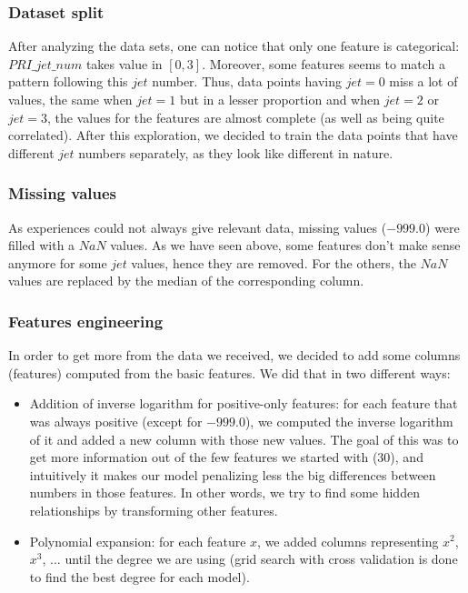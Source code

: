 \documentclass[10pt,conference,compsocconf]{IEEEtran}
\begin{document}
\subsubsection{Dataset split}

After analyzing the data sets, one can notice that only one feature is categorical: $PRI\_jet\_num$ takes value in $[0,3]$. Moreover, some features seems to match a pattern following this $jet$ number. Thus, data points having $jet=0$ miss a lot of values, the same when $jet=1$ but in a lesser proportion and when $jet=2$ or $jet=3$, the values for the features are almost complete (as well as being quite correlated). After this exploration, we decided to train the data points that have different $jet$ numbers separately, as they look like different in nature.

\subsubsection{Missing values}

As experiences could not always give relevant data, missing values ($-999.0$) were filled with a $NaN$ values. As we have seen above, some features don't make sense anymore for some $jet$ values, hence they are removed. For the others, the $NaN$ values are replaced by the median of the corresponding column.

\subsubsection{Features engineering}

In order to get more from the data we received, we decided to add some columns (features) computed from the basic features. We did that in two different ways:
\begin{itemize}
\item Addition of inverse logarithm for positive-only features: for each feature that was always positive (except for $-999.0$), we computed the inverse logarithm of it and added a new column with those new values. The goal of this was to get more information out of the few features we started with (30), and intuitively it makes our model penalizing less the big differences between numbers in those features. In other words, we try to find some hidden relationships by transforming other features.
\item Polynomial expansion: for each feature $x$, we added columns representing $x^2$, $x^3$, ... until the degree we are using (grid search with cross validation is done to find the best degree for each model).
\end{itemize}
\end{document}
